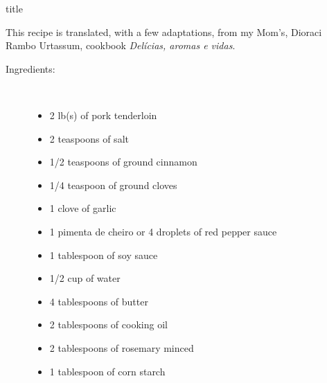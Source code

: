 \documentclass[11pt,letterpaper]{article}
\begin{document}
 {title}

\begin{flushright}
This recipe is translated, with a few adaptations, from my Mom's, Dioraci Rambo Urtassum, cookbook  {\it Delícias, aromas e vidas}.
\end{flushright}

\begin{description}

\item[Ingredients:]\ \\
	\begin{itemize}
	\item 2 lb(s) of pork tenderloin
	\item 2 teaspoons of salt
	\item 1/2 teaspoons of ground cinnamon
	\item 1/4 teaspoon of ground cloves
	\item 1 clove of garlic
	\item 1 pimenta de cheiro or 4 droplets of red pepper sauce
	\item 1 tablespoon of soy sauce
	\item 1/2 cup of water
	\item 4 tablespoons of butter
	\item 2 tablespoons of cooking oil
	\item 2 tablespoons of rosemary minced
	\item 1 tablespoon of corn starch
	\end{itemize}


\end{description}
\end{document}
